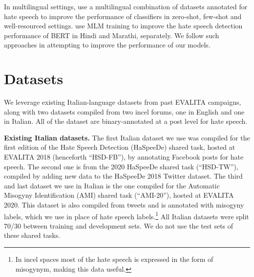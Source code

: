 \documentclass[11pt]{article}
\newcommand{\albert}{\mbox{AlBERTo}}
\newcommand{\hsdfb}{\mbox{HSD-FB}}
\newcommand{\hsdtw}{\mbox{HSD-TW}}
\newcommand{\ami}{\mbox{AMI-20}}
\begin{document}
In multilingual settings,  use a multilingual combination of datasets annotated for hate speech to improve the performance of classifiers in zero-shot, few-shot and well-resourced settings.  use MLM training to improve the hate speech detection performance of BERT in Hindi and Marathi, separately. We follow such approaches in attempting to improve the performance of our models.


\section{Datasets}
\label{sec:ceur-specs}

We leverage existing Italian-language datasets from past EVALITA
campaigns, along with two datasets compiled from two incel forums, one in English and one in Italian. All of the dataset are binary-annotated at a post level for hate speech.

\vspace*{1mm}\noindent\textbf{Existing Italian datasets.} The first Italian dataset we use was compiled for the first edition of the Hate Speech Detection (HaSpeeDe) shared task, hosted at EVALITA 2018 \cite{boscoOverviewEVALITA2018} (henceforth ``\hsdfb''), by annotating Facebook posts for hate speech. The second one is from the 2020 HaSpeeDe shared task \cite{basileEVALITA2020Overview} (``\hsdtw''), compiled by adding new data to the HaSpeeDe 2018 Twitter dataset. The third and last dataset we use in Italian is the one compiled for the Automatic Misogyny Identification (AMI) shared task \cite{fersiniAMIEVALITA2020Automatic2020} (``\ami''), hosted at EVALITA 2020. This dataset is also compiled from tweets and is annotated with misogyny labels, which we use in place of hate speech labels.\footnote{In incel spaces most of the hate speech is expressed in the form of misogynym, making this data useful.} All Italian datasets were split 70/30 between training and development sets. We do not use the test sets of these shared tasks.
\end{document}
